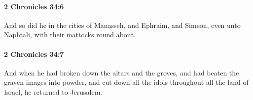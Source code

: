 		\paragraph{2 Chronicles 34:6} %
			\label{2CHRONICLES-34-6}

			And so did he in the cities of Manasseh, and Ephraim, and Simeon, even unto Naphtali, with their mattocks round about.


		\paragraph{2 Chronicles 34:7} %
			\label{2CHRONICLES-34-7}

			And when he had broken down the altars and the groves, and had beaten the graven images into powder, and cut down all the idols throughout all the land of Israel, he returned to Jerusalem.


